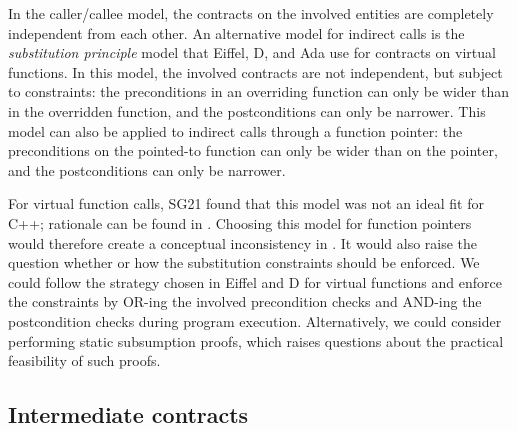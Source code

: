 In the caller/callee model, the contracts on the involved entities are completely independent from each other. An alternative model for indirect calls is the \emph{substitution principle} model that Eiffel, D, and Ada use for contracts on virtual functions. In this model, the involved contracts are not independent, but subject to constraints: the preconditions in an overriding function can only be wider than in the overridden function, and the postconditions can only be narrower. This model can also be applied to indirect calls through a function pointer: the preconditions on the pointed-to function can only be wider than on the pointer, and the postconditions can only be narrower.

For virtual function calls, SG21 found that this model was not an ideal fit for C++; rationale can be found in \cite{P3097R0}. Choosing this model for function pointers would therefore create a conceptual inconsistency in \cite{P2900R8}. It would also raise the question whether or how the substitution constraints should be enforced. We could follow the strategy chosen in Eiffel and D for virtual functions and enforce the constraints by OR-ing the involved precondition checks and AND-ing the postcondition checks during program execution. Alternatively, we could consider performing static subsumption proofs, which raises questions about the practical feasibility of such proofs.

\subsection{Intermediate contracts}
\label{intermediate}

